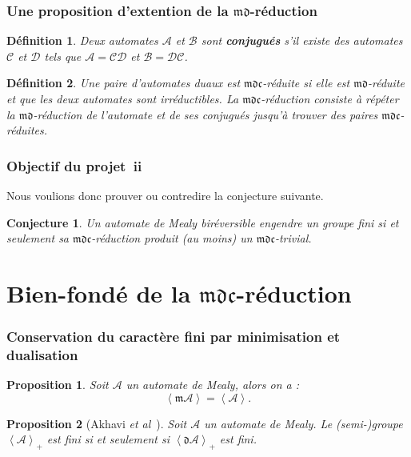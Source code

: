 \documentclass[11pt]{beamer}
\newtheorem{prop}{Proposition}
\newtheorem{defi}{Définition}
\newtheorem{conj}{Conjecture}
\begin{document}
\begin{frame}
  \frametitle{Une proposition d'extention de la $\mathfrak{md}$-réduction}

  \begin{defi}
    \label{def:conj}
    Deux automates $\mathcal{A}$ et $\mathcal{B}$ sont \textbf{\textit{conjugués}} s'il existe des automates $\mathcal{C}$ et $\mathcal{D}$ tels que $\mathcal{A}=\mathcal{CD}$ et $\mathcal{B}=\mathcal{DC}$.
  \end{defi}

  \begin{defi}
    \label{def:mdc-red}
    Une paire d'automates duaux est $\mathfrak{mdc}$-réduite si elle est $\mathfrak{md}$-réduite et que les deux automates sont irréductibles.
    La $\mathfrak{mdc}$-réduction consiste à répéter la $\mathfrak{md}$-réduction de l'automate et de ses conjugués jusqu'à trouver des paires $\mathfrak{mdc}$-réduites.
  \end{defi}

\end{frame}

\begin{frame}
  \frametitle{Objectif du projet~ii}

  Nous voulions donc prouver ou contredire la conjecture suivante.

  \begin{conj}
    \label{conj:birev-mdc}
    Un automate de Mealy biréversible engendre un groupe fini si et seulement sa $\mathfrak{mdc}$-réduction produit (au moins) un $\mathfrak{mdc}$-trivial.
  \end{conj}

\end{frame}

\section{Bien-fondé de la $\mathfrak{mdc}$-réduction}

\begin{frame}
  \frametitle{Conservation du caractère fini par minimisation et dualisation}
  \begin{prop}
    \label{prop:finitude-m}
    Soit $\mathcal{A}$ un automate de Mealy, alors on a :
    \[ \left<\mathfrak{m}\mathcal{A}\right> = \left<\mathcal{A}\right>. \]
  \end{prop}

  \begin{prop}[Akhavi \emph{et al}~\cite{DBLP:journals/corr/abs-1105-4725}]
    \label{prop:finitude-d}
    Soit $\mathcal{A}$ un automate de Mealy. Le (semi-)groupe $\left<\mathcal{A}\right>_+$ est fini si et seulement si $\left<\mathfrak{d}\mathcal{A}\right>_+$ est fini.
  \end{prop}
\end{frame}
\end{document}
